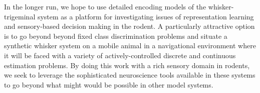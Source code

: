 In the longer run, we hope to use detailed encoding models of the whisker-trigeminal system as a platform for investigating issues of representation learning and sensory-based decision making in the rodent. 
A particularly attractive option is to go beyond beyond fixed class discrimination problems and situate a synthetic whisker system on a mobile animal in a navigational environment where it will be faced with a variety of actively-controlled discrete and continuous estimation problems.
By doing this work with a rich sensory domain in rodents, we seek to leverage the sophisticated neuroscience tools available in these systems to go beyond what might would be possible in other model systems.  

